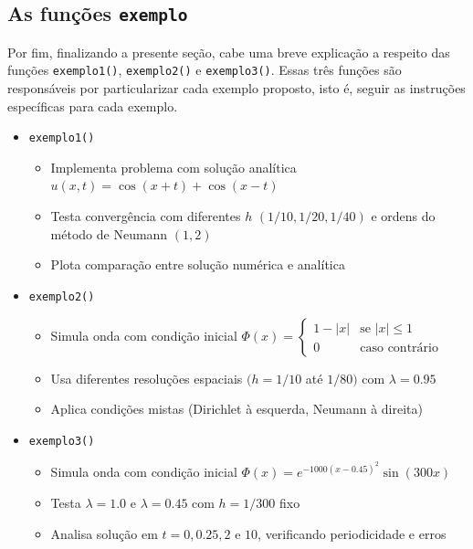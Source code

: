 \documentclass[column,amsmath,amssymb,floatfix]{revtex4}
\begin{document}
\subsection{As funções \texttt{exemplo}}
Por fim, finalizando a presente seção, cabe uma breve explicação a respeito das funções \texttt{exemplo1()}, \texttt{exemplo2()} e \texttt{exemplo3()}. Essas três funções são responsáveis por particularizar cada exemplo proposto, isto é, seguir as instruções específicas para cada exemplo.
\begin{itemize}
	\item \texttt{exemplo1()}
	      \begin{itemize}
	      	\item Implementa problema com solução analítica $u(x,t) = \cos(x+t) + \cos(x-t)$
	      	\item Testa convergência com diferentes $h$ $(1/10, 1/20, 1/40)$ e ordens do método de Neumann $(1,2)$
	      	\item Plota comparação entre solução numérica e analítica
	      \end{itemize}
	      
	\item \texttt{exemplo2()}
	      \begin{itemize}
	      	\item Simula onda com condição inicial $\Phi(x) = \begin{cases} 1-|x| & \text{se } |x|\leq1 \\ 0 & \text{caso contrário} \end{cases}$
	      	\item Usa diferentes resoluções espaciais $(h = 1/10$ até $1/80)$ com $\lambda=0.95$
	      	\item Aplica condições mistas (Dirichlet à esquerda, Neumann à direita)
	      \end{itemize}
	      
	\item \texttt{exemplo3()}
	      \begin{itemize}
	      	\item Simula onda com condição inicial $\Phi(x) = e^{-1000(x-0.45)^2}\sin(300x)$
	      	\item Testa $\lambda = 1.0$ e $\lambda = 0.45$ com $h=1/300$ fixo
	      	\item Analisa solução em $t=0, 0.25, 2$ e $10$, verificando periodicidade e erros
	      \end{itemize}
\end{itemize}
\end{document}
